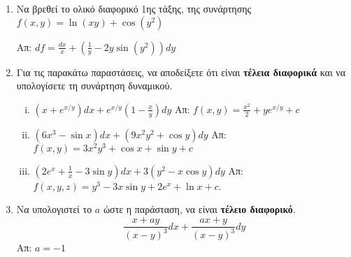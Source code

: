 \begin{enumerate}

  \item Να βρεθεί το ολικό διαφορικό 1ης τάξης, της συνάρτησης 
    $f(x,y)=\ln(xy)+\cos(y^2)$ 

    \hfill Απ: $df=\frac{dx}{x}+\left(\frac{1}{y}-2y\sin(y^2)\right)dy$

  \item Για τις παρακάτω παραστάσεις, να αποδείξετε ότι είναι \textbf{τέλεια
    διαφορικά} και να υπολογίσετε τη συνάρτηση δυναμικού.
    \begin{enumerate}[i)]
      \item $ \left(x+e^{x/y}\right)dx + e^{x/y}\left(1- \frac{x}{y}\right)dy $
        \hfill Απ: $ f(x,y) = \frac{x^{2}}{2} +y e^{x/y} + c $ 

      \item $ (6x^{3}- \sin{x})dx + (9x^{2}y^{2}+ \cos{y})dy $ 
        \hfill Απ: $ f(x,y) = 3x^{2}y^{3}+ \cos{x} + \sin{y} + c $  

      \item $\left(2e^{x}+\frac{1}{x}-3\sin y\right)dx+3(y^2-x\cos y)dy$ 
        \hfill  Απ: $ f(x,y,z) = y^{3}-3x \sin{y} + 2e^{x} + \ln{x} +c $.
    \end{enumerate}

  \item Να υπολογιστεί το $a$ ώστε η παράσταση, να είναι \textbf{τέλειο διαφορικό}.
    \[ \frac{ x + ay }{ (x-y)^{3} }dx + \frac{ ax+y }{ (x-y)^{3} }dy \]
    \hfill Απ: $ a=-1 $
\end{enumerate}



